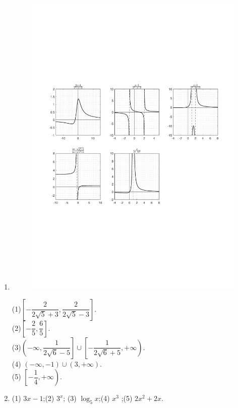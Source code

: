 \begin{enumerate}[label={\textbf{\arabic*.}},leftmargin=
    \inteval{\myenumleftmargin}pt]
\item  %
\begin{figure}[h]
    \centering
    \includegraphics[width=0.95\linewidth]{PDF_Picture/第一章练习题中5个函数图像}
\end{figure}
(1)$ \left[-\dfrac{2}{2\sqrt{5}+3},\dfrac{2}{2\sqrt{5}-3}\right] $. \\
(2)$ \left[-\dfrac{2}{5},\dfrac{6}{5}\right] $. \\
(3)$ \left(-\infty,\dfrac{1}{2\sqrt{6}-5}\right] \cup 
\left[-\dfrac{1}{2\sqrt{6}+5},+\infty\right) $. \\
(4) $ \left(-\infty,-1\right) \cup \left(3,+\infty\right) $. \\
(5) $ \left[-\dfrac{1}{4},+\infty\right) $.

\item (1) $ 3x-1 $;\quad (2) $ 3^x $;\quad 
(3) $ \log_5x $;\quad (4) $ x^3 $ ;\quad (5) $ 2x^2+2x $.


\end{enumerate}
